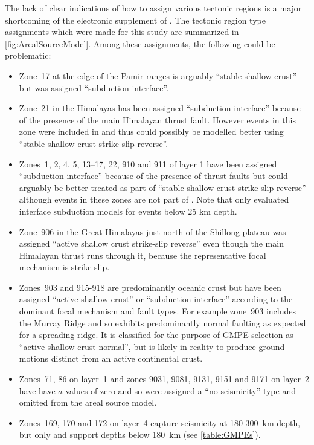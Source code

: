 \documentclass{article}
\begin{document}
The lack of clear indications of how to assign various tectonic regions is a major shortcoming of the electronic supplement of \cite{nath2012probabilistic}. 
The tectonic region type assignments which were made for this study are summarized in \autoref{fig:ArealSourceModel}.
Among these assignments, the following could be problematic:
\begin{itemize}
\item Zone~17 at the edge of the Pamir ranges is arguably ``stable shallow crust'' but was assigned ``subduction interface''.
\item Zone~21 in the Himalayas has been assigned ``subduction interface'' because of the presence of the main Himalayan thrust fault. However events in this zone were included in \cite{sharma2009ground} and thus could possibly be modelled better using ``stable shallow crust strike-slip reverse''.
\item Zones~1, 2, 4, 5, 13--17, 22, 910 and 911 of layer 1 have been assigned ``subduction interface'' because of the presence of thrust faults but could arguably be better treated as part of ``stable shallow crust strike-slip reverse'' although events in these zones are not part of \cite{sharma2009ground}. Note that \cite{nath2011peak} only evaluated interface subduction models for events below 25 km depth.
\item Zone~906 in the Great Himalayas just north of the Shillong plateau was assigned ``active shallow crust strike-slip reverse'' even though the main Himalayan thrust runs through it, because the representative focal mechanism is strike-slip.
\item Zones~903 and 915-918 are predominantly oceanic crust but have been assigned ``active shallow crust'' or ``subduction interface'' according to the dominant focal mechanism and fault types.
For example zone~903 includes the Murray Ridge and so exhibits predominantly normal faulting as expected for a spreading ridge.
It is classified for the purpose of GMPE selection as ``active shallow crust normal'', but is likely in reality to produce ground motions distinct from an active continental crust.
\item Zones~71, 86 on layer~1 and zones 9031, 9081, 9131, 9151 and 9171 on layer~2 have have $a$ values of zero and so were assigned a ``no seismicity'' type and omitted from the areal source model.
\item Zones~169, 170 and 172 on layer~4 capture seismicity at 180-300~km depth, but only \cite{youngs1997strong} and \cite{kanno2006new} support depths below 180~km (see \autoref{table:GMPEs}).
\end{itemize}
\end{document}
